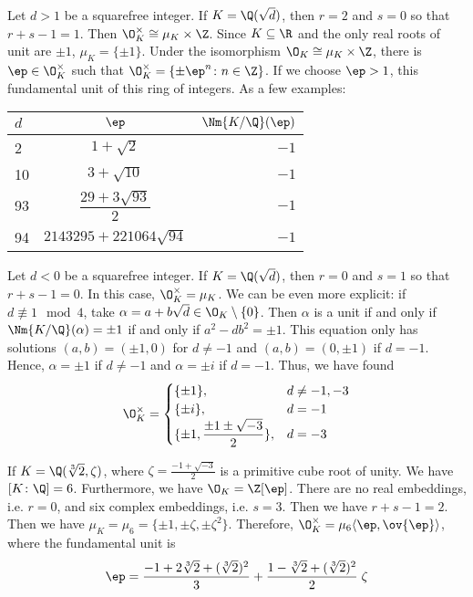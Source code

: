 \begin{ex}
Let $d>1$ be a squarefree integer. If $K=\Q(\sqrt{d})$, then $r=2$ and $s=0$ so that $r+s-1=1$. Then $\O_K^\times \cong \mu_K \times \Z$. Since $K \subseteq \R$ and the only real roots of unit are $\pm 1$, $\mu_K=\{\pm 1\}$. Under the isomorphism $\O_K \cong \mu_K \times \Z$, there is $\ep \in \O_K^\times$ such that $\O_K^\times=\{ \pm \ep^n \colon n \in \Z\}$. If we choose $\ep>1$, this fundamental unit of this ring of integers. As a few examples:
	\begin{table}[H]
	\centering
	\begin{tabular}{lcr}
	$d$ & $\ep$ & $\Nm{K/\Q}(\ep)$ \\ \hline
	2 & $1+\sqrt{2}$ & $-1$ \\
	10 & $3+\sqrt{10}$ & $-1$ \\
	93 & $\dfrac{29+3\sqrt{93}}{2}$ & $-1$ \\
	94 & $2143295+221064 \sqrt{94}$ & $-1$
	\end{tabular}
	\end{table}
\xqed
\end{ex}


\begin{ex}
Let $d<0$ be a squarefree integer. If $K=\Q(\sqrt{d})$, then $r=0$ and $s=1$ so that $r+s-1=0$. In this case, $\O_K^\times=\mu_K$. We can be even more explicit: if $d \not\equiv 1 \mod 4$, take $\alpha=a+b\sqrt{d} \in \O_K\setminus\{0\}$. Then $\alpha$ is a unit if and only if $\Nm{K/\Q}(\alpha)= \pm 1$ if and only if $a^2-db^2= \pm 1$. This equation only has solutions $(a,b)=(\pm1,0)$ for $d\neq -1$ and  $(a,b)=(0,\pm 1)$ if $d= -1$. Hence, $\alpha= \pm 1$ if $d\neq -1$ and $\alpha= \pm i$ if $d=-1$. Thus, we have found
	\[
	\O_K^\times=
	\begin{cases}
	\{\pm 1\}, & d \neq -1,-3 \\
	\{\pm i\}, & d= -1 \\
	\{\pm 1, \dfrac{\pm 1 \pm \sqrt{-3}}{2} \}, & d= -3
	\end{cases}
	\] \xqed
\end{ex}


\begin{ex}
If $K=\Q(\sqrt[3]{2},\zeta)$, where $\zeta= \frac{-1+\sqrt{-3}}{2}$ is a primitive cube root of unity. We have $[K \colon \Q]=6$. Furthermore, we have $\O_K=\Z[\ep]$. There are no real embeddings, i.e. $r=0$, and six complex embeddings, i.e. $s=3$. Then we have $r+s-1= 2$. Then we have $\mu_K= \mu_6= \{\pm 1, \pm \zeta, \pm \zeta^2\}$. Therefore, $\O_K^\times=\mu_6 \langle \ep,\ov{\ep}\rangle$, where the fundamental unit is
	\[
	\ep= \dfrac{-1 + 2\sqrt[3]{2} + (\sqrt[3]{2})^2}{3} + \dfrac{1 - \sqrt[3]{2} + (\sqrt[3]{2})^2}{2}\; \zeta
	\] \xqed
\end{ex}


